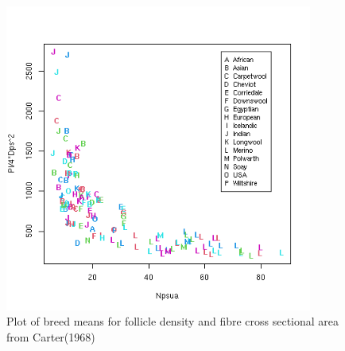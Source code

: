 %

\begin{figure}[h]
  \centering
   \includegraphics[width=0.9\textwidth]{cartercsaxn.png}
  \caption{Plot of breed means for follicle density and fibre cross sectional area from Carter(1968)~\cite{cart:68}}
  \label{fig:carternxc}
\end{figure}

%

